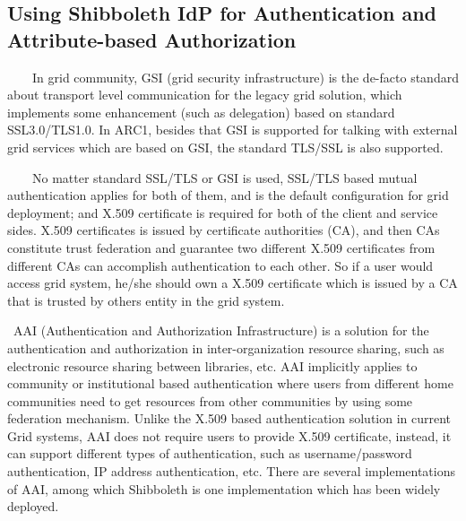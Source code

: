 \documentclass{article}
\begin{document}
\bigskip

\subsection[Using Shibboleth IdP for Authentication and Attribute-based
Authorization]{Using \foreignlanguage{english}{Shibboleth} IdP for
Authentication and Attribute-based Authorization}
{\color{black}
\ \ \ \ In grid community, GSI (grid security infrastructure) is the
de-facto standard about transport level communication for the legacy
grid solution, which implements some enhancement (such as delegation)
based on standard SSL3.0/TLS1.0. In ARC1, besides that GSI is supported
for talking with external grid services which are based on GSI, the
standard TLS/SSL is also supported.}

{\color{black}
\ \ \ \ No matter standard SSL/TLS or GSI is used, SSL/TLS based mutual
authentication applies for both of them, and is the default
configuration for grid deployment; and X.509 certificate is required
for both of the client and service sides. X.509 certificates is issued
by certificate authorities (CA), and then CAs constitute trust
federation and guarantee two different X.509 certificates from
different CAs can accomplish authentication to each other. So if a user
would access grid system, he/she should own a X.509 certificate which
is issued by a CA that is trusted by other{\textquotesingle}s entity in
the grid system.}

{\upshape\color{black}
\ AAI (Authentication and Authorization Infrastructure) is a solution
for the authentication and authorization in inter-organization resource
sharing, such as electronic resource sharing between libraries, etc.
AAI implicitly applies to community or institutional based
authentication where users from different home communities need to get
resources from other communities by using some federation mechanism.
Unlike the X.509 based authentication solution in current Grid systems,
AAI does not require users to provide X.509 certificate, instead, it
can support different types of authentication, such as
username/password authentication, IP address authentication, etc. There
are several implementations of AAI, among which Shibboleth is one
implementation which has been widely deployed.}
\end{document}
